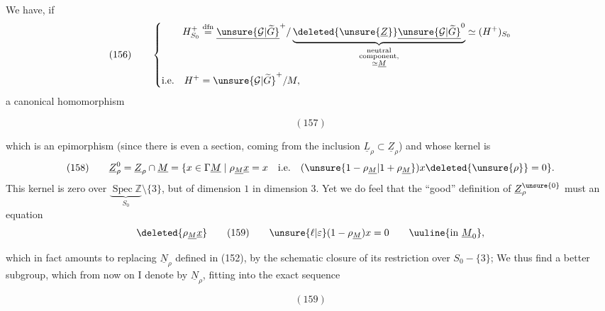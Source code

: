 We have, if
\[
(156)\qquad\left\{
\begin{aligned}
H^+_{S_0}&\overset{\mathrm{dfn}}{=}
\underline{\unsure{\mathcal G|\widetilde G}}^{+}/
\underbrace{\deleted{\unsure{\underline Z}}\underline{\unsure{\mathcal G|\widetilde G}}^{0}}_{\substack{\text{neutral}\\\text{component,}\\\simeq\underline M}}
\simeq(H^+)_{S_0}\\
\text{i.e.}\quad H^+&=\unsure{\mathcal G|\widetilde G}^{+}/M,
\end{aligned}\right.
\]
a canonical homomorphism
\begin{samepage}
\[
(157)
\]
\end{samepage}
which is an epimorphism (since there is even a section, coming from the inclusion $\underline L_\rho\subset\underline Z_\rho$) and whose kernel is
\[
(158)\qquad
\underline Z_\rho^0=\underline Z_\rho\cap\underline M
=\{x\in\Gamma\underline M\mid\rho_{\underline M}\underline x=x\quad\text{i.e.}\quad(\unsure{1-\rho_{\underline M}|1+\rho_{\underline M}})x\deleted{\unsure{\rho}}=0\}.
\]
This kernel is zero over $\underbrace{\operatorname{Spec}\mathbb Z}_{S_0}\setminus\{3\}$,
but of dimension $1$ in dimension $3$. Yet we do feel that the ``good'' definition of $\underline Z_\rho^{\unsure{0}}$  must  an equation
\[
\deleted{\rho_{\underline M}\underline x}\qquad
(159)\qquad \unsure{\ell|\varepsilon}(1-\rho_{\underline M})x=0\qquad\uuline{\text{in }\underline M_0},
\]


which in fact amounts  to replacing $\underline N_\rho$ defined in (152), by the schematic closure of its restriction over $S_0-\{3\}$; We thus find a better subgroup, which from now on I denote by $\underline N_\rho$, fitting into the exact sequence
\begin{samepage}
\[
(159)
\]
\end{samepage}

